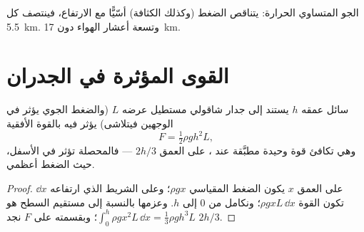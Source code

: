 \begin{omfigure}

{\small الجو المتساوي الحرارة: يتناقص الضغط (وكذلك الكثافة)
أسّيًّا مع الارتفاع، فينتصف كل \qty{5.5}{km}. وتسعة أعشار
الهواء دون \qty{17}{km}.}
\end{omfigure}

\section{القوى المؤثرة في الجدران}

\begin{proposition}\label{prop:b1:fluid-statics:wall}
سائل عمقه $h$ يستند إلى جدار شاقولي مستطيل عرضه $L$ (والضغط
الجوي يؤثر في الوجهين فيتلاشى) يؤثر فيه بالقوة الأفقية
\[
F = \tfrac12\rho gh^2L ,
\]
وهي تكافئ قوة وحيدة مطبَّقة عند \emph{}، على العمق
$2h/3$ --- فالمحصلة تؤثر في الأسفل، حيث الضغط أعظمي.
\end{proposition}

\begin{proof}
على العمق $x$ يكون الضغط المقياسي $\rho gx$؛ وعلى الشريط الذي
ارتفاعه $\dd x$ تكون القوة $\rho gxL\,\dd x$؛ ونكامل من $0$ إلى $h$. وعزمها
بالنسبة إلى مستقيم السطح هو $\int_0^h\rho gx^2L\,\dd x = \tfrac13\rho gh^3L$؛
وبقسمته على $F$ نجد  $2h/3$.
\end{proof}

